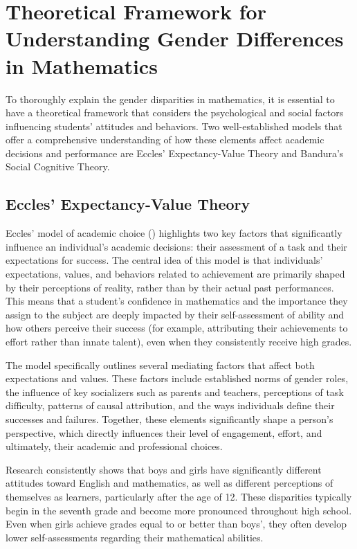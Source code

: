 \section{Theoretical Framework for Understanding Gender Differences in Mathematics}
To thoroughly explain the gender disparities in mathematics, it is essential to have a theoretical framework that considers the psychological and social factors influencing students' attitudes and behaviors. Two well-established models that offer a comprehensive understanding of how these elements affect academic decisions and performance are Eccles' Expectancy-Value Theory and Bandura's Social Cognitive Theory.

\subsection{Eccles' Expectancy-Value Theory}
Eccles' model of academic choice (\cite{eccles1989}) highlights two key factors that significantly influence an individual's academic decisions: their assessment of a task and their expectations for success. The central idea of this model is that individuals' expectations, values, and behaviors related to achievement are primarily shaped by their perceptions of reality, rather than by their actual past performances. This means that a student's confidence in mathematics and the importance they assign to the subject are deeply impacted by their self-assessment of ability and how others perceive their success (for example, attributing their achievements to effort rather than innate talent), even when they consistently receive high grades.

The model specifically outlines several mediating factors that affect both expectations and values. These factors include established norms of gender roles, the influence of key socializers such as parents and teachers, perceptions of task difficulty, patterns of causal attribution, and the ways individuals define their successes and failures. Together, these elements significantly shape a person's perspective, which directly influences their level of engagement, effort, and ultimately, their academic and professional choices.

Research consistently shows that boys and girls have significantly different attitudes toward English and mathematics, as well as different perceptions of themselves as learners, particularly after the age of 12. These disparities typically begin in the seventh grade and become more pronounced throughout high school. Even when girls achieve grades equal to or better than boys', they often develop lower self-assessments regarding their mathematical abilities. 

